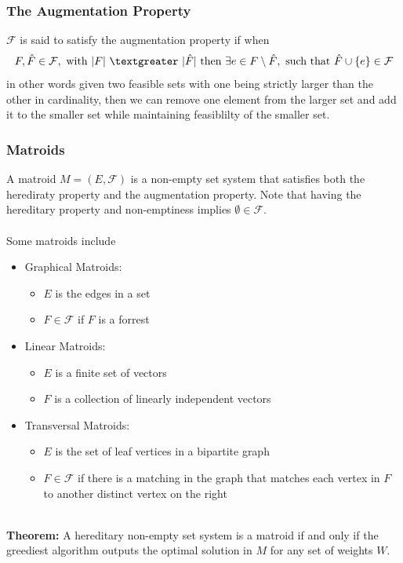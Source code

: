 \documentclass{article}
\newcommand{\emp}{\emptyset}
\newcommand{\gt}{\textgreater}
\newcommand{\thm}{\textbf{Theorem: }}
\newcommand{\mcal}[1]{\mathcal{#1}}
\begin{document}
\subsubsection{The Augmentation Property}
$\mcal{F}$ is said to satisfy the augmentation property if when
\[F, \hat{F} \in \mcal{F}, \text{ with } |F|\ \gt\ |\hat{F}| \text{ then } \exists e \in F \setminus \hat{F}, \text{ such that } \hat{F} \cup \{e\} \in \mcal{F}\]
in other words given two feasible sets with one being strictly larger than the other in cardinality, then we can remove one element from the larger set and add it to the smaller set while maintaining feasiblilty of the smaller set.
\subsubsection{Matroids}
A matroid $M = (E, \mcal{F})$ is a non-empty set system that satisfies both the herediraty property and the augmentation property. Note that having the hereditary property and non-emptiness implies $\emp \in \mcal{F}$.\\\\
Some matroids include
\begin{itemize}
	\item Graphical Matroids:
	\begin{itemize}
		\item $E$ is the edges in a set
		\item $F \in \mcal{F}$ if $F$ is a forrest
	\end{itemize}
	\item Linear Matroids:
	\begin{itemize}
		\item $E$ is a finite set of vectors
		\item $F$ is a collection of linearly independent vectors
	\end{itemize}
	\item Transversal Matroids:
	\begin{itemize}
		\item $E$ is the set of leaf vertices in a bipartite graph
		\item $F \in \mcal{F}$ if there is a matching in the graph that matches each vertex in $F$ to another distinct vertex on the right
	\end{itemize}
\end{itemize}
\ \\
\thm A hereditary non-empty set system is a matroid if and only if the greediest algorithm outputs the optimal solution in $M$ for any set of weights $W$.\\\\
\end{document}
